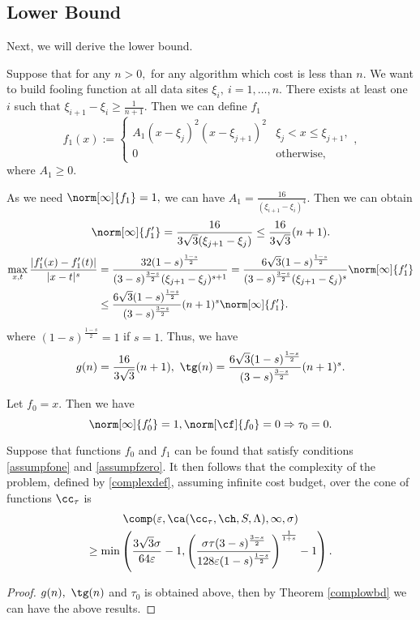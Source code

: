 \subsection{Lower Bound}
Next, we will derive the lower bound.

Suppose that for any $n>0,$ for any algorithm which cost is less than $n.$
We want to build fooling function at all data sites $\xi_{i}, \ i=1,\ldots,n.$
There exists at least one $i$ such that $\xi_{i+1}-\xi_{i}\ge\frac{1}{n+1}.$
Then we can define $f_{1}$
$$f_{1}(x):=\left\{\begin{matrix}
A_{1}(x-\xi_{j})^{2}(x-\xi_{j+1})^{2} & \xi_{j}< x \leq \xi_{j+1},\\
0 & \text{otherwise},
\end{matrix}\right.,$$
where $A_{1} \ge 0.$

As we need $\norm[\infty]{f_1}=1,$ we can have $A_{1}=\frac{16}{(\xi_{i+1}-\xi_{i})^4}.$
Then we can obtain
$$\norm[\infty]{f'_1}=\frac{16}{3\sqrt{3}(\xi_{j+1}-\xi_{j})}\leq \frac{16}{3\sqrt{3}}(n+1).$$
\begin{align*}\max_{x,t}\frac{|f'_1(x)-f'_1(t)|}{|x-t|^{s}}&=\frac{32(1-s)^{\frac{1-s}{2}}}{(3-s)^{\frac{3-s}{2}}(\xi_{j+1}-\xi_{j})^{s+1}}
=\frac{6\sqrt{3}(1-s)^{\frac{1-s}{2}}}{(3-s)^{\frac{3-s}{2}}(\xi_{j+1}-\xi_{j})^{s}}\norm[\infty]{f'_1}\\
 & \leq \frac{6\sqrt{3}(1-s)^{\frac{1-s}{2}}}{(3-s)^{\frac{3-s}{2}}}(n+1)^s\norm[\infty]{f'_1}.
 \end{align*}
 where $(1-s)^{\frac{1-s}{2}}=1$ if $s=1.$
Thus, we have
$$g(n)=\frac{16}{3\sqrt{3}}(n+1), \ \tg(n)=\frac{6\sqrt{3}(1-s)^{\frac{1-s}{2}}}{(3-s)^{\frac{3-s}{2}}}(n+1)^s.$$

Let $f_0=x.$ Then we have
$$\norm[\infty]{f'_0}=1, \norm[\cf]{f_0}=0 \Rightarrow \tau_0=0.$$

\begin{theorem} \label{complowbdappr} Suppose that functions $f_{0}$ and $f_1$ can be found that satisfy conditions \eqref{assumpfone} and \eqref{assumpfzero}.  It then follows that the complexity of the problem, defined by \eqref{complexdef}, assuming infinite cost budget, over the cone of functions $\cc_{\tau}$ is
\begin{multline*}
\comp(\varepsilon,\ca(\cc_{\tau},\ch,S,\Lambda),\infty,\sigma) \\
\ge \min\left(\frac{3\sqrt{3}\sigma}{64 \varepsilon}-1, \left(\frac{\sigma\tau(3-s)^{\frac{3-s}{2}}}{128\varepsilon(1-s)^{\frac{1-s}{2}}}\right)^{\frac{1}{1+s}}-1 \right).
\end{multline*}
\end{theorem}

\begin{proof}
$g(n), \ \tg(n)$ and $\tau_0$ is obtained above, then by Theorem \ref{complowbd}
we can have the above results.
\end{proof}




